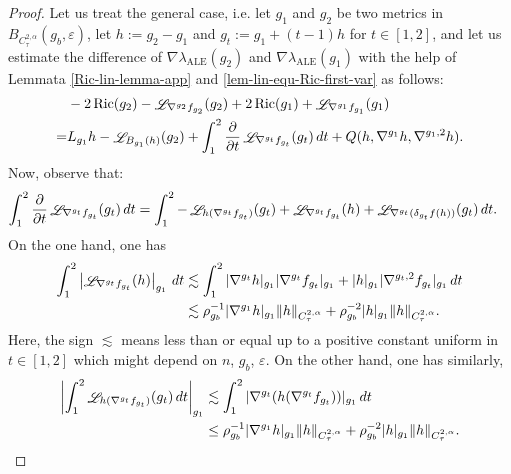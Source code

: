 \documentclass[a4paper,11pt,reqno]{amsart}
\def\Ric{\mathop{\rm Ric}\nolimits}
\def\Li{\mathop{\rm \mathscr{L}}\nolimits}
\def\Ric{\mathop{\rm Ric}\nolimits}
\def\Li{\mathop{\rm \mathscr{L}}\nolimits}
\numberwithin{equation}{section}
\begin{document}
\begin{proof}
		Let us treat the general case, i.e. let $g_1$ and $g_2$ be two metrics in $B_{C^{2,\alpha}_{\tau}}(g_b,\varepsilon)$, let $h:=g_2-g_1$ and $g_t:=g_1+(t-1)h$ for $t\in[1,2]$, and let us estimate the difference of $\nabla\lambda_{\operatorname{ALE}}(g_2)$ and $\nabla\lambda_{\operatorname{ALE}}(g_1)$ with the help of Lemmata \ref{Ric-lin-lemma-app} and \ref{lem-lin-equ-Ric-first-var} as follows:
		\begin{equation}
		\begin{split}\label{first-diff-lambda}
		&-2\Ric(g_2)-\Li_{\nabla^{g_2}f_{g_2}}(g_2)+2\Ric(g_1)+\Li_{\nabla^{g_1}f_{g_1}}(g_1)\\
		=&L_{g_1}h-\Li_{B_{g_1}(h)}(g_2)+\int_1^2\frac{\partial}{\partial t}\Li_{\nabla^{g_t}f_{g_t}}(g_t)\,dt+Q(h,\nabla^{g_1}h,\nabla^{g_1,2}h).
		\end{split}
		\end{equation}
		Now, observe that:
		\begin{equation}
		\begin{split}\label{int-first-der-lie-f}
		\int_1^2\frac{\partial}{\partial t}\Li_{\nabla^{g_t}f_{g_t}}(g_t)\,dt&=\int_1^2-\Li_{h(\nabla^{g_t}f_{g_t})}(g_t)+\Li_{\nabla^{g_t}f_{g_t}}(h)+\Li_{\nabla^{g_t}(\delta_{g_t}f(h))}(g_t)\,dt.
		\end{split}
		\end{equation}
		On the one hand, one has
		\begin{equation}
		\begin{split}\label{one-first-term-lie}
		\int_1^2\left|\Li_{\nabla^{g_t}f_{g_t}}(h)\right|_{g_1}\,dt&\lesssim\int_1^2|\nabla^{g_t}h|_{g_1}|\nabla^{g_t}f_{g_t}|_{g_1}+|h|_{g_1}|\nabla^{g_t,2}f_{g_t}|_{g_1} \,dt\\
		&\lesssim \rho_{g_b}^{-1}|\nabla^{g_1}h|_{g_1}\|h\|_{C^{2,\alpha}_{\tau}}+\rho_{g_b}^{-2}|h|_{g_1}\|h\|_{C^{2,\alpha}_{\tau}}.
		\end{split}
		\end{equation}
		Here, the sign $\lesssim$ means less than or equal up to a positive constant uniform in $t\in[1,2]$ which might depend on $n$, $g_b$, $\varepsilon$.
		On the other hand, one has similarly,
		\begin{equation}
		\begin{split}\label{sec-first-term-lie}
		\left|\int_1^2\Li_{h(\nabla^{g_t}f_{g_t})}(g_t)\,dt\right|_{g_1}&\lesssim\int_1^2|\nabla^{g_t}(h(\nabla^{g_t}f_{g_t}))|_{g_1} \,dt\\
		&\leq \rho_{g_b}^{-1}|\nabla^{g_1}h|_{g_1}\|h\|_{C^{2,\alpha}_{\tau}}+\rho_{g_b}^{-2}|h|_{g_1}\|h\|_{C^{2,\alpha}_{\tau}}.

\end{split}
\end{equation}
\end{proof}
\end{document}
